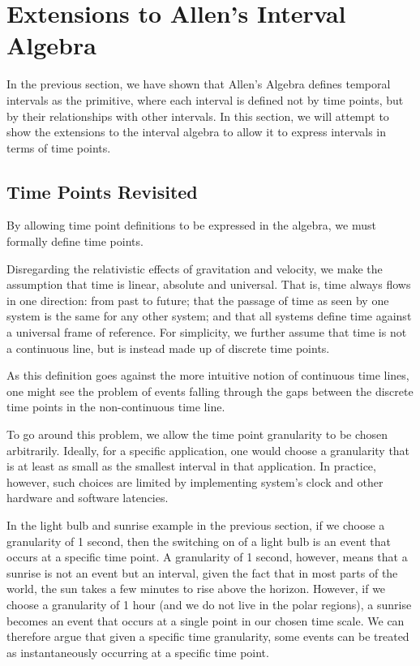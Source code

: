 \documentclass[11pt]{report}
\begin{document}
    \section{Extensions to Allen's Interval Algebra}

      In the previous section, we have shown that Allen's Algebra defines temporal
      intervals as the primitive, where each interval is defined not by time points,
      but by their relationships with other intervals. In this section, we will attempt
      to show the extensions to the interval algebra to allow it to express intervals
      in terms of time points.

      \subsection{Time Points Revisited}

        By allowing time point definitions to be expressed in the algebra, we must
        formally define time points.

        Disregarding the relativistic effects of gravitation and velocity, we make the
        assumption that time is linear, absolute and universal. That is, time always
        flows in one direction: from past to future; that the passage of time as seen
        by one system is the same for any other system; and that all systems define
        time against a universal frame of reference. For simplicity, we further assume
        that time is not a continuous line, but is instead made up of discrete time
        points.

        As this definition goes against the more intuitive notion of continuous time
        lines, one might see the problem of events falling through the gaps between
        the discrete time points in the non-continuous time line.

        To go around this problem, we allow the time point granularity to be chosen
        arbitrarily. Ideally, for a specific application, one would choose a
        granularity that is at least as small as the smallest interval in that
        application. In practice, however, such choices are limited by implementing
        system's clock and other hardware and software latencies.

        In the light bulb and sunrise example in the previous section, if we
        choose a granularity of 1 second, then the switching on of a light bulb is an
        event that occurs at a specific time point. A granularity of 1 second,
        however, means that a sunrise is not an event but an interval, given the fact
        that in most parts of the world, the sun takes a few minutes to rise above the
        horizon. However, if we choose a granularity of 1 hour (and we do not
        live in the polar regions), a sunrise becomes an event that occurs at a single
        point in our chosen time scale. We can therefore argue that given a specific
        time granularity, some events can be treated as instantaneously occurring at a
        specific time point.
\end{document}
